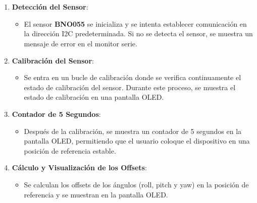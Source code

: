 \\ \\
\begin{enumerate}
    \item \textbf{Detección del Sensor}:
    \begin{itemize}
        \item El sensor \textbf{BNO055} se inicializa y se intenta establecer comunicación en la dirección I2C predeterminada. Si no se detecta el sensor, se muestra un mensaje de error en el monitor serie.
    \end{itemize}

    \item \textbf{Calibración del Sensor}:
    \begin{itemize}
        \item Se entra en un bucle de calibración donde se verifica continuamente el estado de calibración del sensor. Durante este proceso, se muestra el estado de calibración en una pantalla OLED.
    \end{itemize}

    \item \textbf{Contador de 5 Segundos}:
    \begin{itemize}
        \item Después de la calibración, se muestra un contador de 5 segundos en la pantalla OLED, permitiendo que el usuario coloque el dispositivo en una posición de referencia estable.
    \end{itemize}

    \item \textbf{Cálculo y Visualización de los Offsets}:
    \begin{itemize}
        \item Se calculan los offsets de los ángulos (roll, pitch y yaw) en la posición de referencia y se muestran en la pantalla OLED.
    \end{itemize}
\end{enumerate}
\\ \\
